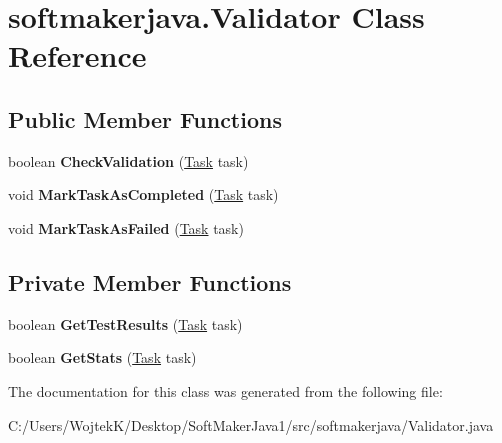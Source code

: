 \hypertarget{classsoftmakerjava_1_1_validator}{}\section{softmakerjava.\+Validator Class Reference}
\label{classsoftmakerjava_1_1_validator}
\subsection*{Public Member Functions}
\begin{DoxyCompactItemize}
\item 
boolean {\bfseries Check\+Validation} (\hyperlink{classsoftmakerjava_1_1_task}{Task} task)\hypertarget{classsoftmakerjava_1_1_validator_ac3d368de65875241e7c6636dca24627d}{}\label{classsoftmakerjava_1_1_validator_ac3d368de65875241e7c6636dca24627d}

\item 
void {\bfseries Mark\+Task\+As\+Completed} (\hyperlink{classsoftmakerjava_1_1_task}{Task} task)\hypertarget{classsoftmakerjava_1_1_validator_a7c363b5e2d71a53e81a52c459580f53c}{}\label{classsoftmakerjava_1_1_validator_a7c363b5e2d71a53e81a52c459580f53c}

\item 
void {\bfseries Mark\+Task\+As\+Failed} (\hyperlink{classsoftmakerjava_1_1_task}{Task} task)\hypertarget{classsoftmakerjava_1_1_validator_a012e45c2a22e305c248e1722ab7cb30b}{}\label{classsoftmakerjava_1_1_validator_a012e45c2a22e305c248e1722ab7cb30b}

\end{DoxyCompactItemize}
\subsection*{Private Member Functions}
\begin{DoxyCompactItemize}
\item 
boolean {\bfseries Get\+Test\+Results} (\hyperlink{classsoftmakerjava_1_1_task}{Task} task)\hypertarget{classsoftmakerjava_1_1_validator_a7676a8cf6cc9d5673704a2512ab03cc6}{}\label{classsoftmakerjava_1_1_validator_a7676a8cf6cc9d5673704a2512ab03cc6}

\item 
boolean {\bfseries Get\+Stats} (\hyperlink{classsoftmakerjava_1_1_task}{Task} task)\hypertarget{classsoftmakerjava_1_1_validator_a0f668559db973289cec25aa153eed2c9}{}\label{classsoftmakerjava_1_1_validator_a0f668559db973289cec25aa153eed2c9}

\end{DoxyCompactItemize}


The documentation for this class was generated from the following file\+:\begin{DoxyCompactItemize}
\item 
C\+:/\+Users/\+Wojtek\+K/\+Desktop/\+Soft\+Maker\+Java1/src/softmakerjava/Validator.\+java\end{DoxyCompactItemize}
